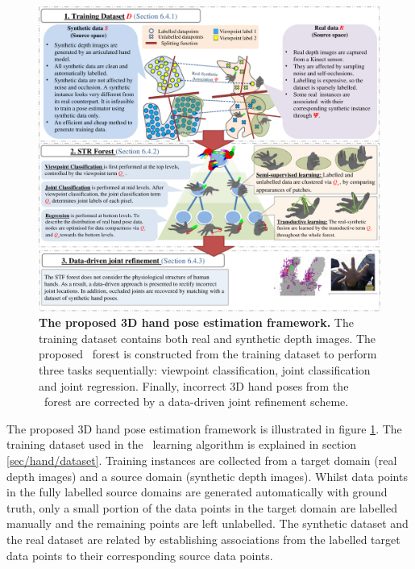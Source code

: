 \begin{figure}[ht]
	\includegraphics[width=1.00\linewidth]{fig/hand/overview3.pdf}
	\caption{
		\textbf{The proposed 3D hand pose estimation framework.} The training dataset contains both real and synthetic depth images. The proposed \STR\ forest is constructed from the training dataset to perform three tasks sequentially: viewpoint classification, joint classification and joint regression. Finally, incorrect 3D hand poses from the \STR\ forest are corrected by a data-driven joint refinement scheme. }
	\label{fig/hand/concept}
\end{figure}


The proposed 3D hand pose estimation framework is illustrated in figure \ref{fig/hand/concept}.
The training dataset used in the \STR\ learning algorithm is explained in section \ref{sec/hand/dataset}.
Training instances are collected from a target domain (real depth images) and a source domain (synthetic depth images). Whilst data points in the fully labelled source domains are generated automatically with ground truth, only a small portion of the data points in the target domain are labelled manually and the remaining points are left unlabelled. The synthetic dataset and the real dataset are related by establishing associations from the labelled target data points to their corresponding source data points.

